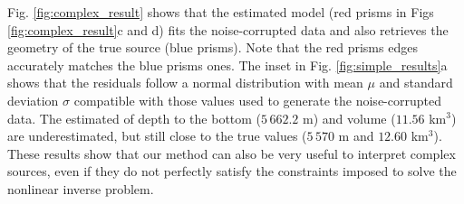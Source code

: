 Fig. \ref{fig:complex_result} shows that the estimated model (red prisms in Figs \ref{fig:complex_result}c and d) fits the noise-corrupted data and also retrieves the geometry of the true source (blue prisms). 
Note that the red prisms edges accurately matches the blue prisms ones. 
The inset in Fig. \ref{fig:simple_results}a shows that the residuals follow a normal distribution with mean $ \mu $ and standard deviation $ \sigma $ compatible with those values used to generate the noise-corrupted data. 
The estimated of depth to the bottom  ($ 5\,662.2 $ m) and volume ($ 11.56 $ km$^3 $) are underestimated, but still close to the true values ($ 5\,570 $ m and $ 12.60 $ km$^3 $). 
These results show that our method can also be very useful to interpret complex sources, even if they do not perfectly satisfy the constraints imposed to solve the nonlinear inverse problem.